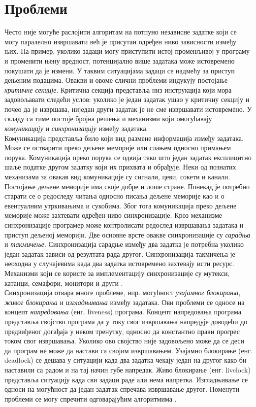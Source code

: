 \documentclass[12pt,oneside]{memoir}
\begin{document}
  \section{Проблеми}
  Често није могуће раслојити алгоритам на потпуно независне задатке који се могу паралелно извршавати већ је присутан одређен ниво зависности између њих. На пример, уколико задаци могу приступити истој променљивој у програму и променити њену вредност, потенцијално више задатака може истовремено покушати да је измени. У таквим ситуацијама задаци се надмећу за приступ дењеним подацима.  Овакви и овоме слични проблеми индукују постојање \emph{критичне секције}. Критична секција представља низ инструкција који мора задовољавати следећи услов: уколико је један задатак ушао у критичну секцију и почео да је извршава, ниједан други задатак је не сме извршавати истовремено. У складу са тиме постоје бројна решења и механизми који омогућавају \emph{комуникацију} и  \emph{синхронизацију} између задатака.
\\ 
 \indent  
Комуникација представља било који вид размене информација између задатака. Може се остварити преко дељене меморије или слањем односно примањем порука. Комуникација преко порука се одвија тако што један задатак експлицитно шаље податке другом задатку који их прихвата и обрађује. Неки од познатих механизама за овакав вид комуникације су сигнали, цеви, сокети и канали.
Постојање дељене меморије има своје добре и лоше стране. Понекад је потребно старати се о редоследу читања односно писања дељене меморије као и о евентуалним утркивањима и сукобима. Због тога комуникација преко дељене меморије може захтевати одређен ниво синхронизације. Кроз механизме синхронизације програмер може контролисати редослед извршавања задатака и приступ дељеној меморији. Две основне врсте овакве синхронизације су \emph{сарадња} и \emph{такмичење}. Синхронизација сарадње између два задатка је потребна уколико један задатак зависи од резултата рада другог. Синхронизација такмичења је неоходна у случајевима када два задатка истовремено захтевају исти ресурс. Механизми који се користе за имплементацију синхронизације су мутекси, катанци, семафори, монитори и други \cite{lang_prag}.
\\ \indent Синхронизација отвара многе проблеме, нпр. могућност \emph{узајамног блокирања}, \emph{живог блокирања} и \emph{изгладњивања} између задатака. Ови проблеми се односе на концепт \emph{напредовања} (енг. liveness) програма. Концепт напредовања програма представља својство програма да у току свог извршавања напредује доводећи до предвиђеног догађаја у неком тренутку, односно да константно прави прогрес током свог извршавања. Уколико ово својство није задовољено може да се деси да програм не може да настави са својим извршавањем. Узајамно блокирање (енг. deadlock) се дешава у ситуацији када два задатка чекају један на другог како би наставили са радом и на тај начин губе напредак. Живо блокирање (енг. livelock) представља ситуацију када сви задаци раде али нема напретка. Изгладњивање се односи на могућност да један задатак спречава извршавање другог. Поменути проблеми се могу спречити одговарајућим алгоритмима \cite{opsis}.
\end{document}
